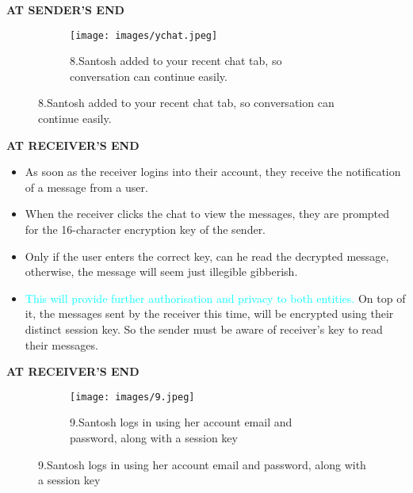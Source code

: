 \documentclass{beamer}
\begin{document}
\begin{frame}
\begin{tcolorbox}
\begin{center}
\textsc{\textbf{\textcolor{byzantium}{AT SENDER'S END}}}
\end{center}
\end{tcolorbox}
\begin{figure}
\centering
\begin{subfigure}{\textwidth}
  \centering
  \texttt{[image: images/ychat.jpeg]}
  \caption{8.Santosh added to your recent chat tab, so conversation can continue easily. }
  \label{fig:sub1}
\end{subfigure}
\end{figure}
\end{frame}


\begin{frame}
\begin{tcolorbox}
\begin{center}
\textsc{\textbf{\textcolor{byzantium}{AT RECEIVER'S END}}}
\end{center} 
\end{tcolorbox}
\begin{flushleft}
\begin{itemize}
\item As soon as the receiver logins into their account, they receive the notification of a message from a user. 
\item When the receiver clicks the chat to view the messages, they are prompted for the 16-character encryption key of the sender. 
\item Only if the user enters the correct key, can he read the decrypted message, otherwise, the message will seem just illegible gibberish. 
\item \textcolor{cyan}{This will provide further authorisation and privacy to both entities.}
On top of it, the messages sent by the receiver this time, will be encrypted using their distinct session key. So the sender must be aware of receiver’s key to read their messages.
\end{itemize}
\end{flushleft}
\end{frame}


\begin{frame}
\begin{tcolorbox}
\begin{center}
\textsc{\textbf{\textcolor{byzantium}{AT RECEIVER'S END}}}
\end{center}
\end{tcolorbox}
\begin{figure}
\centering
\begin{subfigure}{\textwidth}
  \centering
  \texttt{[image: images/9.jpeg]}
  \caption{9.Santosh logs in using her account email and password, along with a session key }
  \label{fig:sub1}
\end{subfigure}
\end{figure}
\end{frame}
\end{document}
